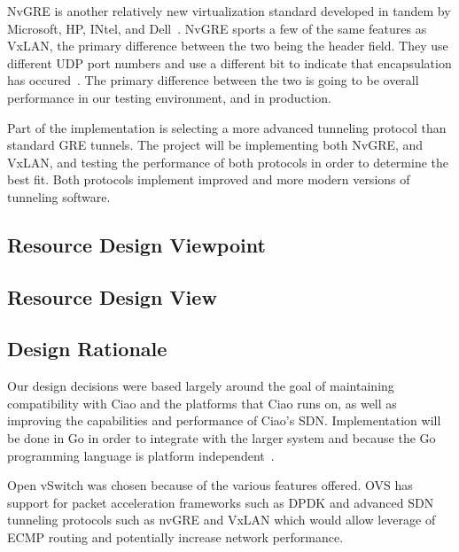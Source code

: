 \documentclass[10pt,onecolumn,journal,draftclsnofoot]{IEEEtran}
\begin{document}
NvGRE is another relatively new virtualization standard developed in tandem by
Microsoft, HP, INtel, and Dell~\cite{nvgre-info}. NvGRE sports a few of the
same features as VxLAN, the primary difference between the two being the header
field. They use different UDP port numbers and use a different bit to indicate
that encapsulation has occured~\cite{nvgre}. The primary difference between the
two is going to be overall performance in our testing environment, and in
production.

Part of the implementation is selecting a more advanced tunneling protocol than
standard GRE tunnels. The project will be implementing both NvGRE, and VxLAN,
and testing the performance of both protocols in order to determine the best
fit. Both protocols implement improved and more modern versions of tunneling
software. 

\subsection{Resource Design Viewpoint}

\subsection{Resource Design View}

\subsection{Design Rationale}

Our design decisions were based largely around the goal of maintaining
compatibility with Ciao and the platforms that Ciao runs on, as well as
improving the capabilities and performance of Ciao's SDN. Implementation will be
done in Go in order to integrate with the larger system and because the Go
programming language is platform independent~\cite{gogoodfor}.

Open vSwitch was chosen because of the various features offered. OVS has support
for packet acceleration frameworks such as DPDK and advanced SDN tunneling
protocols such as nvGRE and VxLAN which would allow leverage of ECMP routing and
potentially increase network performance.

\clearpage
\end{document}
